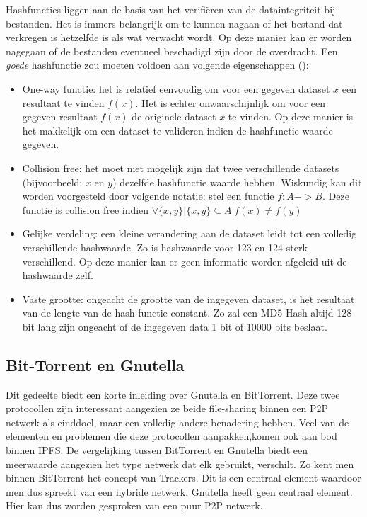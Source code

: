 Hashfuncties liggen aan de basis van het verifiëren van de dataintegriteit bij bestanden. Het is immers belangrijk om te kunnen nagaan of het bestand dat verkregen is hetzelfde is als wat verwacht wordt. Op deze manier kan er worden nagegaan of de bestanden eventueel beschadigd zijn door de overdracht. Een \textit{goede} hashfunctie zou moeten voldoen aan volgende eigenschappen (\autocite{Anderson93}):

\begin{itemize}
\item One-way functie: het is relatief eenvoudig om voor een gegeven dataset $x$ een resultaat te vinden $f(x)$. Het is echter onwaarschijnlijk om voor een gegeven resultaat $f(x)$ de originele dataset $x$ te vinden. Op deze manier is het makkelijk om een dataset te valideren indien de hashfunctie waarde gegeven.\\
\item Collision free: het moet niet mogelijk zijn dat twee verschillende datasets (bijvoorbeeld: $x$ en $y$) dezelfde hashfunctie waarde hebben. Wiskundig kan dit worden voorgesteld door volgende notatie: stel een functie $f:A->B$. Deze functie is collision free indien $\forall \{x,y\}|\{x,y\} \subseteq A | f(x) \neq f(y)$\\
\item Gelijke verdeling: een kleine verandering aan de dataset leidt tot een volledig verschillende hashwaarde. Zo is hashwaarde voor 123 en 124 sterk verschillend. Op deze manier kan er geen informatie worden afgeleid uit de hashwaarde zelf.\\
\item Vaste grootte: ongeacht de grootte van de ingegeven dataset, is het resultaat van de lengte van de hash-functie constant. Zo zal een MD5 Hash altijd 128 bit lang zijn ongeacht of de ingegeven data 1 bit of 10000 bits beslaat.
\end{itemize}


\subsection{Bit-Torrent en Gnutella}
Dit gedeelte biedt een korte inleiding over Gnutella en BitTorrent. Deze twee protocollen zijn interessant aangezien ze beide file-sharing binnen een P2P netwerk als einddoel, maar een volledig andere benadering hebben. Veel van de elementen en problemen die deze protocollen aanpakken,komen ook aan bod binnen IPFS. De vergelijking tussen BitTorrent en Gnutella biedt een meerwaarde aangezien het type netwerk dat elk gebruikt, verschilt. Zo kent men binnen BitTorrent het concept van Trackers. Dit is een centraal element waardoor men dus spreekt van een hybride netwerk. Gnutella heeft geen centraal element. Hier kan dus worden gesproken van een puur P2P netwerk.\\

